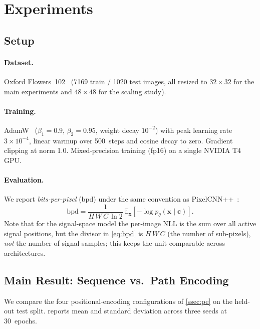 \documentclass[conference]{IEEEtran}
\begin{document}
\section{Experiments}\label{sec:experiments}

\subsection{Setup}

\paragraph{Dataset.}
Oxford Flowers~102~\cite{nilsback2008flowers} (\num{7169} train /
\num{1020} test images, all resized to $32\times32$ for the main
experiments and $48\times48$ for the scaling study).

\paragraph{Training.}
AdamW~\cite{loshchilov2019adamw} ($\beta_1=0.9$, $\beta_2=0.95$,
weight decay $10^{-2}$) with peak learning rate $3\!\times\!10^{-4}$,
linear warmup over 500~steps and cosine decay to zero.
Gradient clipping at norm 1.0. Mixed-precision training (fp16) on a
single NVIDIA T4 GPU.

\paragraph{Evaluation.}
We report \emph{bits-per-pixel} (bpd) under the same convention as
PixelCNN++~\cite{salimans2017pixelcnnpp}:
\begin{equation}\label{eq:bpd}
  \text{bpd} = \frac{1}{H\,W\,C\,\ln 2}\,\mathbb{E}_{\mathbf{x}}\!\left[
    -\log p_\theta(\mathbf{x}\mid\mathbf{c})\right].
\end{equation}
Note that for the signal-space model the per-image NLL is the sum
over all active signal positions, but the divisor in
\cref{eq:bpd} is $H\,W\,C$ (the number of sub-pixels), \emph{not}
the number of signal samples; this keeps the unit comparable across
architectures.

\subsection{Main Result: Sequence vs.\ Path Encoding}\label{ssec:main}

We compare the four positional-encoding configurations of
\cref{ssec:pe} on the held-out test split.  reports
mean and standard deviation across three seeds at 30~epochs.
\end{document}
